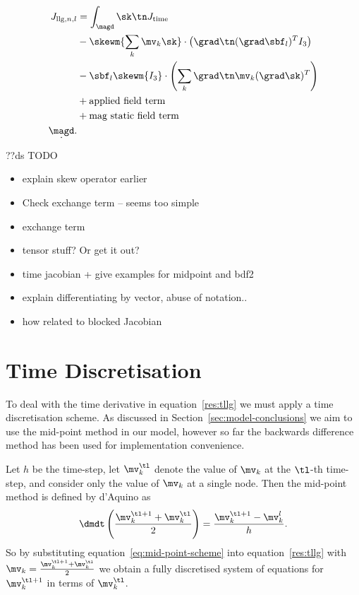 \begin{align}
  J_{\text{llg},n,l} &= \int_{\magd} \sk \tn J_\text{time} \\
  &- \skewm{\sum_k \mv_k \sk} \cdot \left( \grad \tn (\grad \sbf_l)^T I_3 \right) \\
  &- \sbf_l \skewm{I_3} \cdot \left( \sum_k \grad \tn \mv_k (\grad \sk)^T \right) \\
  &+ \text{applied field term} \\
  &+ \text{mag static field term} \\
  \d \magd.
\end{align}

??ds TODO
\begin{itemize}
\item explain skew operator earlier
\item Check exchange term -- seems too simple
\item exchange term
\item tensor stuff? Or get it out?
\item time jacobian + give examples for midpoint and bdf2
\item explain differentiating by vector, abuse of notation..
\item how related to blocked Jacobian
\end{itemize}



\section{Time Discretisation}
\label{sec:time-discretisation-resi}

To deal with the time derivative in equation~\eqref{res:tllg} we must apply a time discretisation scheme. As discussed in Section~\ref{sec:model-conclusions} we aim to use the mid-point method in our model, however so far the backwards difference method has been used for implementation convenience.

Let $h$ be the time-step, let $\mv_k^\tl$ denote the value of $\mv_k$ at the $\tl$-th time-step, and consider only the value of $\mv_k$ at a single node. Then the mid-point method is defined by d'Aquino\cite{DAquino2005} as
\begin{equation}
  \label{eq:mid-point-scheme}
  \dmdt \left( \frac{\mv_k^{\tl+1} + \mv_k^\tl}{2} \right) = \frac{\mv_k^{\tl+1} - \mv_k^l}{ h}.
\end{equation}
So by substituting equation~\eqref{eq:mid-point-scheme} into equation~\eqref{res:tllg} with $\mv_k = \frac{\mv_k^{\tl+1} + \mv^\tl_k}{2}$ we obtain a fully discretised system of equations for $\mv_k^{\tl+1}$ in terms of $\mv_k^\tl$.

